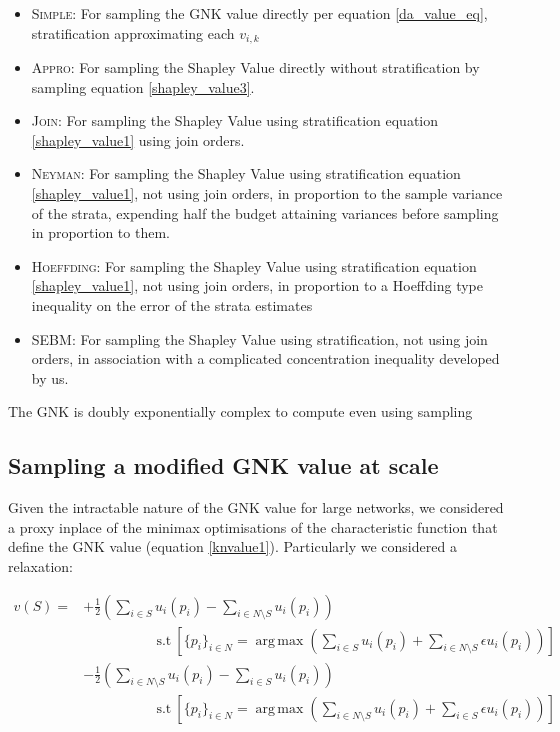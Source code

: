 \documentclass[
10pt, %
a4paper, %
oneside, %
headinclude,footinclude, %
BCOR5mm, %
]{scrartcl}
\DeclareMathOperator*{\argmax}{arg\,max}
\begin{document}
\begin{itemize}
\item	\textsc{Simple}: For sampling the GNK value directly per equation \ref{da_value_eq}, stratification approximating each $v_{i,k}$ 
\item	\textsc{Appro}: For sampling the Shapley Value directly without stratification by sampling equation \ref{shapley_value3}. \cite{DBLP:journals/cor/CastroGT09}
\item	\textsc{Join}: For sampling the Shapley Value using stratification equation \ref{shapley_value1} using join orders. \cite{CASTRO2017180}
\item	\textsc{Neyman}: For sampling the Shapley Value using stratification equation \ref{shapley_value1}, not using join orders, in proportion to the sample variance of the strata, expending half the budget attaining variances before sampling in proportion to them. \cite{CASTRO2017180,1938.10503378}
\item	\textsc{Hoeffding}: For sampling the Shapley Value using stratification equation \ref{shapley_value1}, not using join orders, in proportion to a Hoeffding type inequality on the error of the strata estimates \cite{2013arXiv1306.4265M}
\item	\textsc{SEBM}: For sampling the Shapley Value using stratification, not using join orders, in association with a complicated concentration inequality developed by us.
\end{itemize}



The GNK is doubly exponentially complex to compute even using sampling



\subsection{Sampling a modified GNK value at scale}\label{sec:modified_gnk}

Given the intractable nature of the GNK value for large networks, we considered a proxy inplace of the minimax optimisations of the characteristic function that define the GNK value (equation \ref{knvalue1}).
Particularly we considered a relaxation:

\begin{align}
\label{knvalue22}
v(S) = &+ \frac{1}{2}\left(\sum_{i\in S} u_i(p_i) - \sum_{i\in N\setminus S}u_i(p_i)\right)\nonumber\\
&\quad\quad\quad\quad\quad~\text{s.t}~ \left[\{p_i\}_{i\in N}=\argmax \left(\sum_{i\in S} u_i(p_i) + \sum_{i\in N\setminus S}\epsilon u_i(p_i)\right)\right]\nonumber\\
&- \frac{1}{2}\left(\sum_{i\in N\setminus S}u_i(p_i) - \sum_{i\in S} u_i(p_i)\right)\nonumber\\
&\quad\quad\quad\quad\quad~\text{s.t}~ \left[\{p_i\}_{i\in N}=\argmax \left(\sum_{i\in N\setminus S}u_i(p_i) + \sum_{i\in S} \epsilon u_i(p_i) \right)\right]
\end{align}
\end{document}
